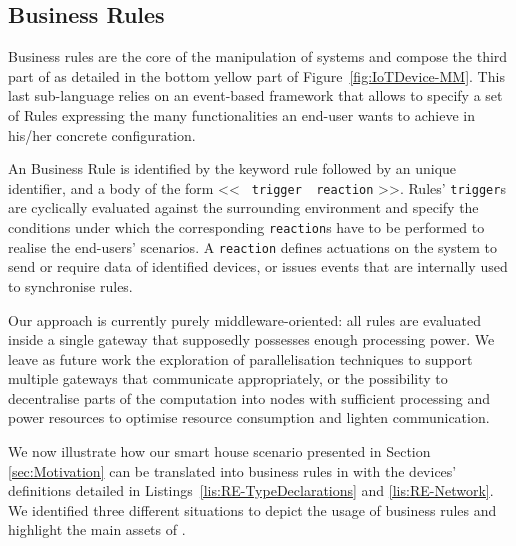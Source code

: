 \subsection{Business Rules}
\label{sec:IoTDSL-BusinessRules}

Business rules are the core of the manipulation of \IOT systems and compose the third part of \IOTDSL as detailed in the bottom yellow part of Figure~\ref{fig:IoTDevice-MM}. This last sub-language relies on an event-based framework that allows to specify a set of \textsf{Rule}s expressing the many functionalities an end-user wants to achieve in his/her concrete configuration. 

An \IOTDSL Business Rule is identified by the keyword \textsf{rule} followed by an unique identifier, and a body of the form << \texttt{\textbf{\color{codeviolet}{when}} trigger \textbf{\color{codeviolet}{do}} reaction} >>. Rules' \texttt{trigger}s are cyclically evaluated against the surrounding environment and specify the conditions under which the corresponding \texttt{reaction}s have to be performed to realise the end-users' scenarios. A \texttt{reaction} defines actuations on the \IOT system to send or require data of identified devices, or issues events that are internally used to synchronise rules. 


Our approach is currently purely middleware-oriented: all rules are evaluated inside a single gateway that supposedly possesses enough processing power. We leave as future work the exploration of parallelisation techniques to support multiple gateways that communicate appropriately, or the possibility to decentralise parts of the computation into nodes with sufficient processing and power resources to optimise resource consumption and lighten communication. 

We now illustrate how our smart house scenario presented in Section \ref{sec:Motivation} can be translated into business rules in \IOTDSL with the devices' definitions detailed in Listings~\ref{lis:RE-TypeDeclarations} and \ref{lis:RE-Network}. We identified three different situations to depict the usage of business rules and highlight the main assets of \IOTDSL.

